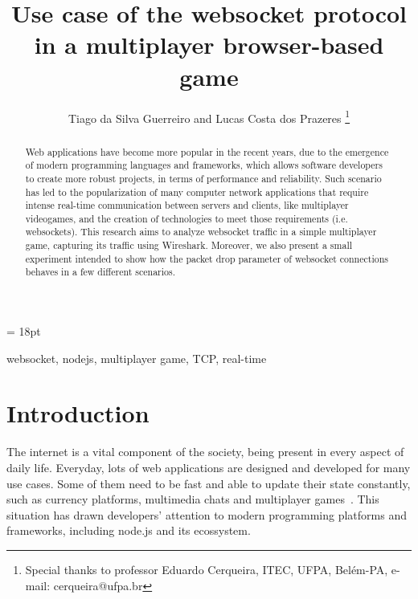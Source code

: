 \documentclass[english]{sbrt}
\begin{document}

\title{Use case of the websocket protocol in a multiplayer browser-based game}

\author{Tiago da Silva Guerreiro and Lucas Costa dos Prazeres
  \thanks{Special thanks to professor Eduardo Cerqueira, ITEC, UFPA, Belém-PA, e-mail: cerqueira@ufpa.br}
}

\maketitle

\baselineskip = 18pt


\begin{abstract}
  Web applications have become more popular in the recent years, due to the emergence of modern programming languages and frameworks, which allows software developers to create more robust projects, in terms of performance and reliability.
  Such scenario has led to the popularization of many computer network applications that require intense real-time communication between servers and clients, like multiplayer videogames, and the creation of technologies to meet those requirements (i.e. websockets).
  This research aims to analyze websocket traffic in a simple multiplayer game, capturing its traffic using Wireshark.
  Moreover, we also present a small experiment intended to show how the packet drop parameter of websocket connections behaves in a few different scenarios.

\end{abstract}
\begin{keywords}
  websocket, nodejs, multiplayer game, TCP, real-time
\end{keywords}

\section{\textbf{Introduction}}

The internet is a vital component of the society, being present in every aspect of daily life.
Everyday, lots of web applications are designed and developed for
many use cases. Some of them need to be fast and able to update their state constantly, such as currency platforms, multimedia chats and multiplayer games~\cite{chen2011framework}\cite{kawase2015development}.
This situation has drawn developers' attention to modern programming platforms and frameworks, including node.js and its ecossystem.
\end{document}
